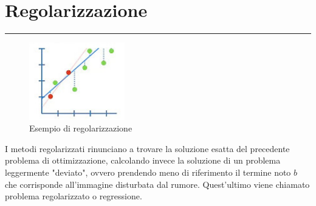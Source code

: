 {\color{ggreen}\section{Regolarizzazione}}
\textcolor{ggreen}{\rule[5pt]{\textwidth}{1pt}}

\begin{figure}
	\centering
	\includegraphics[width=0.370\textwidth]{IMMAGINI_RELAZIONE/Regolarizzazione.jpg}
	\caption{Esempio di regolarizzazione}
\end{figure}

I metodi regolarizzati rinunciano a trovare la soluzione esatta del 
precedente problema di ottimizzazione, calcolando invece la soluzione di un problema leggermente "deviato",  
ovvero prendendo meno di riferimento il termine noto $b$ che corrisponde all'immagine disturbata dal rumore. 
Quest’ultimo viene chiamato problema regolarizzato o regressione.

